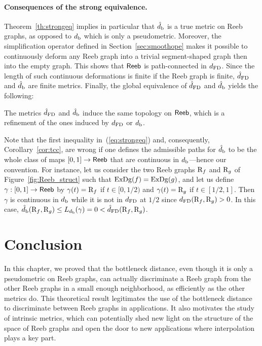 \paragraph*{Consequences of the strong equivalence.} Theorem~\ref{th:strongeq} implies in particular that $\hat d_{\rm b}$ is a
true metric on Reeb graphs, as opposed to $d_{\rm b}$ which is only a
pseudometric.  Moreover,
 the simplification operator defined in
Section~\ref{sec:smoothope} makes it possible to continuously deform any Reeb
graph into a trivial segment-shaped graph then into the empty graph. This shows that ${\sf Reeb}$ is
path-connected in $d_{\rm FD}$. Since the length of such continuous deformations is finite
if the Reeb graph is finite, $\hat d_{\rm FD}$ and $\hat d_{\rm b}$ are finite
metrics. Finally, the global equivalence of $\hat d_{\rm FD}$ and
$\hat d_{\rm b}$ yields the following:

\begin{cor}\label{cor:tcc} 
The metrics $\hat d_{\rm FD}$ and $\hat d_{\rm b}$ induce the same topology on ${\sf Reeb}$,
which is a refinement of the ones induced by $d_{\rm FD}$ or $d_{\rm b}$.
\end{cor}

Note that the first inequality in~(\ref{eq:strongeq}) and,
consequently, Corollary~\ref{cor:tcc}, are wrong if one defines the
admissible paths for $\hat d_{\rm b}$ to be the whole class of maps
$[0,1]\to{\sf Reeb}$ that are continuous in $d_{\rm b}$---hence our convention.
For instance, let us consider the two Reeb graphs $\mathrm{R}_f$ and
$\mathrm{R}_g$ of Figure~\ref{fig:Reeb_struct} such that $\mathrm{ExDg}(f)=\mathrm{ExDg}(g)$, and
let us define $\gamma:[0,1]\rightarrow{\sf Reeb}$ by $\gamma(t)=\mathrm{R}_f$ if
$t\in[0,1/2)$ and $\gamma(t)=\mathrm{R}_g$ if $t\in[1/2,1]$.  Then $\gamma$
  is continuous in $d_{\rm b}$ while it is not in $d_{\rm FD}$ at $1/2$
  since $d_{\rm FD}(\mathrm{R}_f,\mathrm{R}_g)>0$.  In this case,
  $\hat d_{\rm b}(\mathrm{R}_f,\mathrm{R}_g)\leq
  L_{d_{\rm b}}(\gamma)=0<\hat d_{\rm FD}(\mathrm{R}_f,\mathrm{R}_g)$.

\section{Conclusion}

In this chapter, we proved that the bottleneck distance, even though
it is only a pseudometric on Reeb graphs, can actually discriminate a
Reeb graph from the other Reeb graphs in a small enough neighborhood,
as efficiently as the other metrics do.  This theoretical result
legitimates the use of the bottleneck distance to discriminate between
Reeb graphs in applications. It also motivates the study of intrinsic
metrics, which can potentially shed new light on the structure of the
space of Reeb graphs and open the door to new applications where
interpolation plays a key part.  

